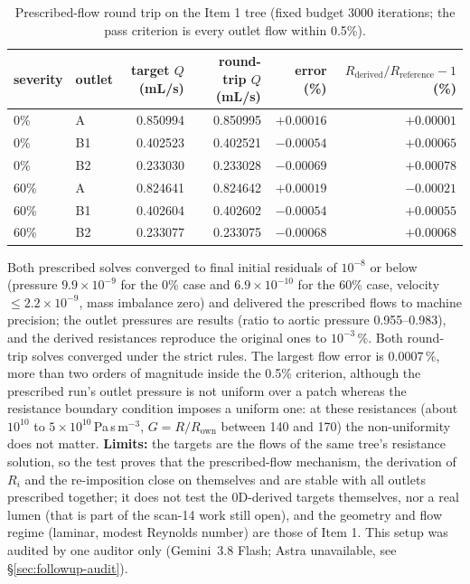 \documentclass[11pt]{article}
\begin{document}
\begin{table}[H]
\centering
\caption{Prescribed-flow round trip on the Item 1 tree (fixed budget 3000 iterations; the pass criterion is every outlet flow within 0.5\%).}
\label{tab:item1-roundtrip}
\small
\begin{tabular}{llrrrr}
\toprule
severity & outlet & target $Q$ (mL/s) & round-trip $Q$ (mL/s) & error (\%) & $R_\text{derived}/R_\text{reference}-1$ (\%) \\
\midrule
0\% & A & 0.850994 & 0.850995 & $+0.00016$ & $+0.00001$ \\
0\% & B1 & 0.402523 & 0.402521 & $-0.00054$ & $+0.00065$ \\
0\% & B2 & 0.233030 & 0.233028 & $-0.00069$ & $+0.00078$ \\
60\% & A & 0.824641 & 0.824642 & $+0.00019$ & $-0.00021$ \\
60\% & B1 & 0.402604 & 0.402602 & $-0.00054$ & $+0.00055$ \\
60\% & B2 & 0.233077 & 0.233075 & $-0.00068$ & $+0.00068$ \\
\bottomrule
\end{tabular}
\end{table}

Both prescribed solves converged to final initial residuals of $10^{-8}$ or below (pressure $9.9\times10^{-9}$ for the 0\% case and $6.9\times10^{-10}$ for the 60\% case, velocity $\leq2.2\times10^{-9}$, mass imbalance zero) and delivered the prescribed flows to machine precision; the outlet pressures are results (ratio to aortic pressure 0.955--0.983), and the derived resistances reproduce the original ones to $10^{-3}\,\%$. Both round-trip solves converged under the strict rules. The largest flow error is $0.0007\,\%$, more than two orders of magnitude inside the 0.5\% criterion, although the prescribed run's outlet pressure is not uniform over a patch whereas the resistance boundary condition imposes a uniform one: at these resistances (about $10^{10}$ to $5\times10^{10}$\,Pa\,s\,m$^{-3}$, $G=R/R_\text{own}$ between 140 and 170) the non-uniformity does not matter. \textbf{Limits:} the targets are the flows of the same tree's resistance solution, so the test proves that the prescribed-flow mechanism, the derivation of $R_i$ and the re-imposition close on themselves and are stable with all outlets prescribed together; it does not test the 0D-derived targets themselves, nor a real lumen (that is part of the scan-14 work still open), and the geometry and flow regime (laminar, modest Reynolds number) are those of Item 1. This setup was audited by one auditor only (Gemini~3.8 Flash; Astra unavailable, see \S\ref{sec:followup-audit}).
\end{document}

